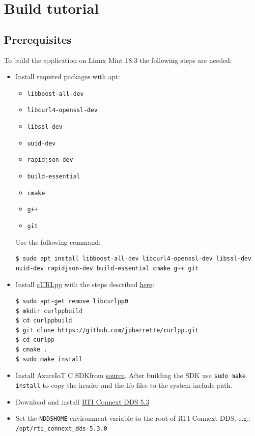 \documentclass{article}
\begin{document}
\section{Build tutorial}
\subsection{Prerequisites}

To build the application on Linux Mint 18.3 the following steps are needed:

\begin{itemize}
\item Install required packages with apt: 
\begin{itemize}
\item \verb+libboost-all-dev+
\item \verb+libcurl4-openssl-dev+
\item \verb+libssl-dev+ %
\item \verb+uuid-dev+
\item \verb+rapidjson-dev+
\item \verb+build-essential+
\item \verb+cmake+
\item \verb!g++!
\item \verb+git+
\end{itemize}
Use the following command:
\begin{lstlisting}
$ sudo apt install libboost-all-dev libcurl4-openssl-dev libssl-dev uuid-dev rapidjson-dev build-essential cmake g++ git
\end{lstlisting}
\item Install \href{http://www.curlpp.org/}{cURLpp} with the steps described \href{https://github.com/beniz/deepdetect/issues/126}{here}:
\begin{verbatim}
$ sudo apt-get remove libcurlpp0
$ mkdir curlppbuild
$ cd curlppbuild
$ git clone https://github.com/jpbarrette/curlpp.git
$ cd curlpp
$ cmake .
$ sudo make install
\end{verbatim} 
\item Install AzureIoT C SDKfrom \href{https://github.com/Azure/azure-iot-sdk-c/blob/master/doc/devbox_setup.md}{source}. After building the SDK use \verb+sudo make install+ to copy the header and the lib files to the system include path.
\item Download and install \href{https://www.rti.com/gettingstarted/installlinux_secure}{RTI Connext DDS 5.3}
\item Set the \verb+NDDSHOME+ environment variable to the root of RTI Connext DDS, e.g.: \verb+/opt/rti_connext_dds-5.3.0+
\end{itemize}
\end{document}
